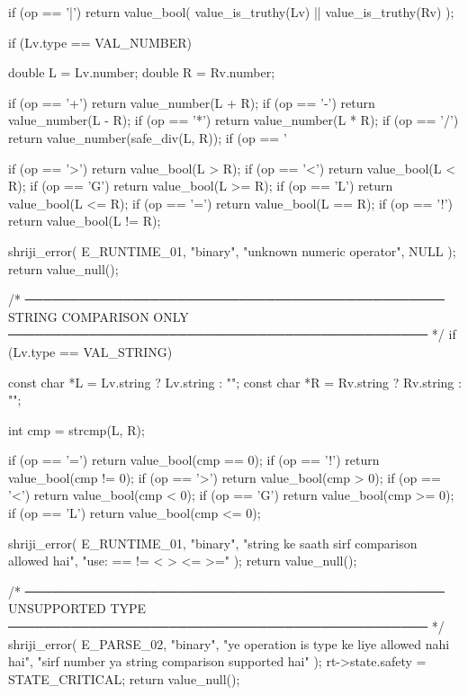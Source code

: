 \documentclass{article}
\begin{document}
{{{if (op == '|') {
    return value_bool(
        value_is_truthy(Lv) || value_is_truthy(Rv)
    );
}


    if (Lv.type == VAL_NUMBER) {

        double L = Lv.number;
        double R = Rv.number;


        if (op == '+') return value_number(L + R);
        if (op == '-') return value_number(L - R);
        if (op == '*') return value_number(L * R);
        if (op == '/') return value_number(safe_div(L, R));
        if (op == '%

        if (op == '>') return value_bool(L > R);
        if (op == '<') return value_bool(L < R);
        if (op == 'G') return value_bool(L >= R);
        if (op == 'L') return value_bool(L <= R);
        if (op == '=') return value_bool(L == R);
        if (op == '!') return value_bool(L != R);

        shriji_error(
            E_RUNTIME_01,
            "binary",
            "unknown numeric operator",
            NULL
        );
        return value_null();
    }

    /* ───────────────────────────────────────────────
       STRING COMPARISON ONLY
    ─────────────────────────────────────────────── */
    if (Lv.type == VAL_STRING) {

        const char *L = Lv.string ? Lv.string : "";
        const char *R = Rv.string ? Rv.string : "";

        int cmp = strcmp(L, R);

         if (op == '=') return value_bool(cmp == 0);
         if (op == '!') return value_bool(cmp != 0);
         if (op == '>') return value_bool(cmp > 0);
         if (op == '<') return value_bool(cmp < 0);
         if (op == 'G') return value_bool(cmp >= 0);
         if (op == 'L') return value_bool(cmp <= 0);


        shriji_error(
            E_RUNTIME_01,
            "binary",
            "string ke saath sirf comparison allowed hai",
            "use: == != < > <= >="
        );
        return value_null();
    }

    /* ───────────────────────────────────────────────
       UNSUPPORTED TYPE
    ─────────────────────────────────────────────── */
    shriji_error(
        E_PARSE_02,
        "binary",
        "ye operation is type ke liye allowed nahi hai",
        "sirf number ya string comparison supported hai"
    );
    rt->state.safety = STATE_CRITICAL;
                return value_null();
}


}}
\end{document}
